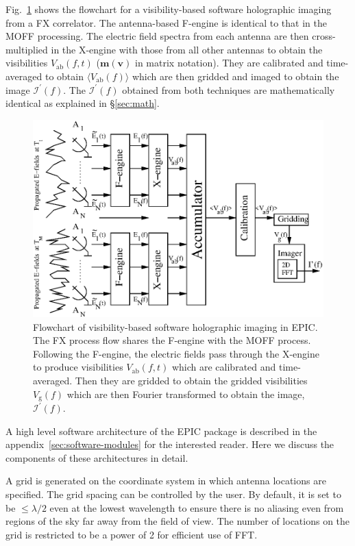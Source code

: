\documentclass[a4paper,fleqn,usenatbib]{mnras}
\begin{document}
Fig.~\ref{fig:FX-flowchart} shows the flowchart for a visibility-based software holographic imaging from a FX correlator. The antenna-based F-engine is identical to that in the MOFF processing. The electric field spectra from each antenna are then cross-multiplied in the X-engine with those from all other antennas to obtain the visibilities $V_\textrm{ab}(f,t)$ ($\mathbf{m}(\mathbf{v})$ in matrix notation). They are calibrated and time-averaged to obtain $\langle V_\textrm{ab}(f)\rangle$ which are then gridded and imaged to obtain the image $\mathcal{I}^\prime(f)$. The $\mathcal{I}^\prime(f)$ obtained from both techniques are mathematically identical as explained in \S\ref{sec:math}.

\begin{figure}
  \includegraphics[width=\columnwidth]{figure2}
  \caption{Flowchart of visibility-based software holographic imaging in EPIC. The FX process flow shares the F-engine with the MOFF process. Following the F-engine, the electric fields pass through the X-engine to produce visibilities $V_\textrm{ab}(f,t)$ which are calibrated and time-averaged. Then they are gridded to obtain the gridded visibilities $V_\textrm{g}(f)$ which are then Fourier transformed to obtain the image, $\mathcal{I}^\prime(f)$.}
  \label{fig:FX-flowchart}
\end{figure}

A high level software architecture of the EPIC package is described in the appendix~\ref{sec:software-modules} for the interested reader. Here we discuss the components of these architectures in detail. 

\par\medskip
{}
\par\medskip
\noindent A grid is generated on the coordinate system in which antenna locations are specified. The grid spacing can be controlled by the user. By default, it is set to be $\le\lambda/2$ even at the lowest wavelength to ensure there is no aliasing even from regions of the sky far away from the field of view. The number of locations on the grid is restricted to be a power of 2 for efficient use of FFT. 
\end{document}
